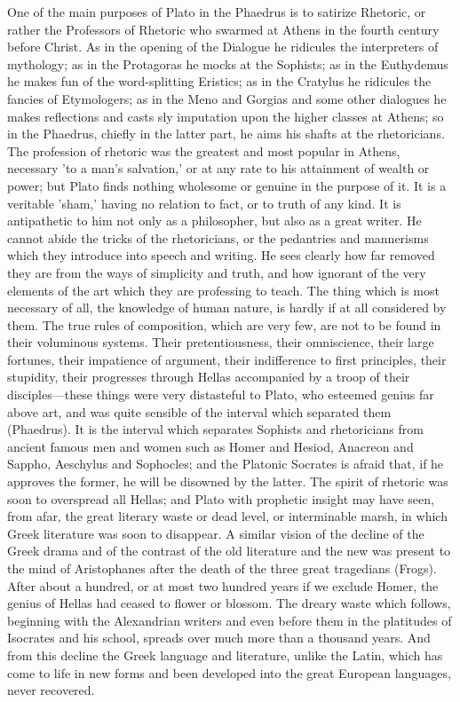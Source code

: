 \documentclass[11pt,letter]{article}
\begin{document}
\par  One of the main purposes of Plato in the Phaedrus is to satirize Rhetoric, or rather the Professors of Rhetoric who swarmed at Athens in the fourth century before Christ. As in the opening of the Dialogue he ridicules the interpreters of mythology; as in the Protagoras he mocks at the Sophists; as in the Euthydemus he makes fun of the word-splitting Eristics; as in the Cratylus he ridicules the fancies of Etymologers; as in the Meno and Gorgias and some other dialogues he makes reflections and casts sly imputation upon the higher classes at Athens; so in the Phaedrus, chiefly in the latter part, he aims his shafts at the rhetoricians. The profession of rhetoric was the greatest and most popular in Athens, necessary 'to a man's salvation,' or at any rate to his attainment of wealth or power; but Plato finds nothing wholesome or genuine in the purpose of it. It is a veritable 'sham,' having no relation to fact, or to truth of any kind. It is antipathetic to him not only as a philosopher, but also as a great writer. He cannot abide the tricks of the rhetoricians, or the pedantries and mannerisms which they introduce into speech and writing. He sees clearly how far removed they are from the ways of simplicity and truth, and how ignorant of the very elements of the art which they are professing to teach. The thing which is most necessary of all, the knowledge of human nature, is hardly if at all considered by them. The true rules of composition, which are very few, are not to be found in their voluminous systems. Their pretentiousness, their omniscience, their large fortunes, their impatience of argument, their indifference to first principles, their stupidity, their progresses through Hellas accompanied by a troop of their disciples—these things were very distasteful to Plato, who esteemed genius far above art, and was quite sensible of the interval which separated them (Phaedrus). It is the interval which separates Sophists and rhetoricians from ancient famous men and women such as Homer and Hesiod, Anacreon and Sappho, Aeschylus and Sophocles; and the Platonic Socrates is afraid that, if he approves the former, he will be disowned by the latter. The spirit of rhetoric was soon to overspread all Hellas; and Plato with prophetic insight may have seen, from afar, the great literary waste or dead level, or interminable marsh, in which Greek literature was soon to disappear. A similar vision of the decline of the Greek drama and of the contrast of the old literature and the new was present to the mind of Aristophanes after the death of the three great tragedians (Frogs). After about a hundred, or at most two hundred years if we exclude Homer, the genius of Hellas had ceased to flower or blossom. The dreary waste which follows, beginning with the Alexandrian writers and even before them in the platitudes of Isocrates and his school, spreads over much more than a thousand years. And from this decline the Greek language and literature, unlike the Latin, which has come to life in new forms and been developed into the great European languages, never recovered.
\end{document}
